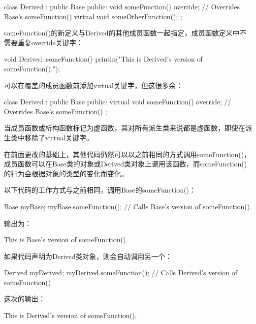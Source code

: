 \begin{cpp}
class Derived : public Base
{
    public:
        void someFunction() override; // Overrides Base's someFunction()
        virtual void someOtherFunction();
};
\end{cpp}

someFunction()的新定义与Derived的其他成员函数一起指定，成员函数定义中不需要重复override关键字：

\begin{cpp}
void Derived::someFunction()
{
    println("This is Derived's version of someFunction().");
}
\end{cpp}

可以在覆盖的成员函数前添加virtual关键字，但这很多余：

\begin{cpp}
class Derived : public Base
{
    public:
        virtual void someFunction() override; // Overrides Base's someFunction()
};
\end{cpp}

当成员函数或析构函数标记为虚函数，其对所有派生类来说都是虚函数，即使在派生类中移除了virtual关键字。


在前面更改的基础上，其他代码仍然可以以之前相同的方式调用someFunction()，成员函数可以在Base类的对象或Derived类对象上调用该函数，而someFunction()的行为会根据对象的类型的变化而变化。

以下代码的工作方式与之前相同，调用Base的someFunction()：

\begin{cpp}
Base myBase;
myBase.someFunction(); // Calls Base's version of someFunction().
\end{cpp}

输出为：

\begin{shell}
This is Base's version of someFunction().
\end{shell}

如果代码声明为Derived类对象，则会自动调用另一个：

\begin{cpp}
Derived myDerived;
myDerived.someFunction(); // Calls Derived's version of someFunction()
\end{cpp}

这次的输出：

\begin{shell}
This is Derived's version of someFunction().
\end{shell}

